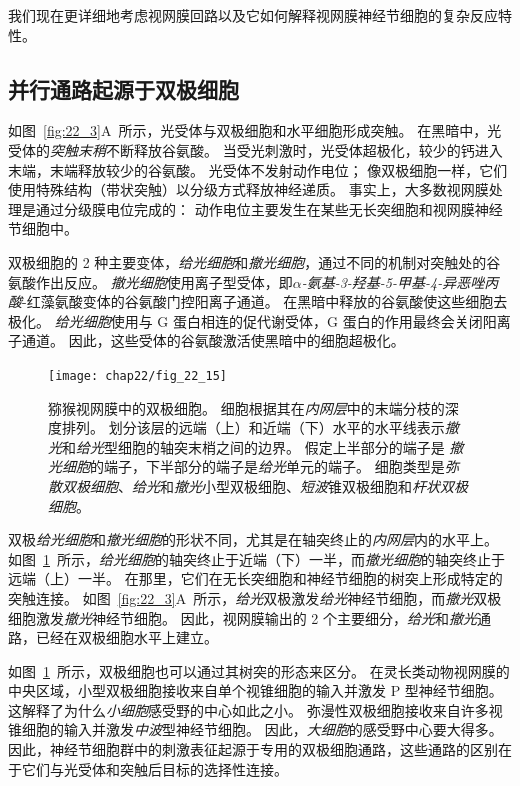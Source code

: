 我们现在更详细地考虑视网膜回路以及它如何解释视网膜神经节细胞的复杂反应特性。


\subsection{并行通路起源于双极细胞}

如图~\ref{fig:22_3}A~所示，光受体与双极细胞和水平细胞形成突触。
在黑暗中，光受体的\textit{突触末稍}不断释放谷氨酸。
当受光刺激时，光受体超极化，较少的钙进入末端，末端释放较少的谷氨酸。
光受体不发射动作电位；
像双极细胞一样，它们使用特殊结构（带状突触）以分级方式释放神经递质。
事实上，大多数视网膜处理是通过分级膜电位完成的：
动作电位主要发生在某些无长突细胞和视网膜神经节细胞中。


双极细胞的 2 种主要变体，\textit{给光细胞}和\textit{撤光细胞}，通过不同的机制对突触处的谷氨酸作出反应。
\textit{撤光细胞}使用离子型受体，即\textit{$\alpha$-氨基-3-羟基-5-甲基-4-异恶唑丙酸}-红藻氨酸变体的谷氨酸门控阳离子通道。
在黑暗中释放的谷氨酸使这些细胞去极化。
\textit{给光细胞}使用与 G 蛋白相连的促代谢受体，G 蛋白的作用最终会关闭阳离子通道。
因此，这些受体的谷氨酸激活使黑暗中的细胞超极化。


\begin{figure}[htbp]
	\centering
	\texttt{[image: chap22/fig\_22\_15]}
	\caption{猕猴视网膜中的双极细胞。
		细胞根据其在\textit{内网层}中的末端分枝的深度排列。
		划分该层的远端（上）和近端（下）水平的水平线表示\textit{撤光}和\textit{给光}型细胞的轴突末梢之间的边界。
		假定上半部分的端子是 \textit{撤光细胞}的端子，下半部分的端子是\textit{给光}单元的端子。
		细胞类型是\textit{弥散双极细胞}、\textit{给光}和\textit{撤光}小型双极细胞、\textit{短波}锥双极细胞和\textit{杆状双极细胞}。}
	\label{fig:22_15}
\end{figure}


双极\textit{给光细胞}和\textit{撤光细胞}的形状不同，尤其是在轴突终止的\textit{内网层}内的水平上。
如图~\ref{fig:22_15}~所示，\textit{给光细胞}的轴突终止于近端（下）一半，而\textit{撤光细胞}的轴突终止于远端（上）一半。
在那里，它们在无长突细胞和神经节细胞的树突上形成特定的突触连接。
如图~\ref{fig:22_3}A~所示，\textit{给光}双极激发\textit{给光}神经节细胞，而\textit{撤光}双极细胞激发\textit{撤光}神经节细胞。
因此，视网膜输出的 2 个主要细分，\textit{给光}和\textit{撤光}通路，已经在双极细胞水平上建立。


如图~\ref{fig:22_15}~所示，双极细胞也可以通过其树突的形态来区分。
在灵长类动物视网膜的中央区域，小型双极细胞接收来自单个视锥细胞的输入并激发 P 型神经节细胞。
这解释了为什么\textit{小细胞}感受野的中心如此之小。
弥漫性双极细胞接收来自许多视锥细胞的输入并激发\textit{中波}型神经节细胞。
因此，\textit{大细胞}的感受野中心要大得多。
因此，神经节细胞群中的刺激表征起源于专用的双极细胞通路，这些通路的区别在于它们与光受体和突触后目标的选择性连接。



